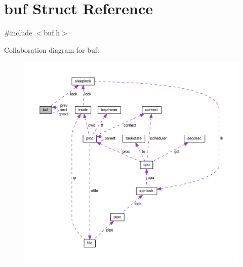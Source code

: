 \hypertarget{structbuf}{}\section{buf Struct Reference}
\label{structbuf}


{\ttfamily \#include $<$buf.\+h$>$}



Collaboration diagram for buf\+:\nopagebreak
\begin{figure}[H]
\begin{center}
\leavevmode
\includegraphics[width=350pt]{d6/d72/structbuf__coll__graph}
\end{center}
\end{figure}
